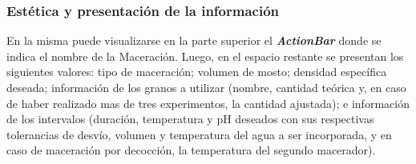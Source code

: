             \subsubsection{Estética y presentación de la información}
            \par En la misma puede visualizarse en la parte superior el \textbf{\textit{\gls{ActionBar}}} donde se indica el nombre de la Maceración. Luego, en el espacio restante se presentan los siguientes valores: tipo de maceración; volumen de mosto; densidad específica deseada; información de los granos a utilizar (nombre, cantidad teórica y, en caso de haber realizado mas de tres experimentos, la cantidad ajustada); e información de los intervalos (duración, temperatura y pH deseados con sus respectivas tolerancias de desvío, volumen y temperatura del agua a ser incorporada, y en caso de maceración por decocción, la temperatura del segundo macerador).
